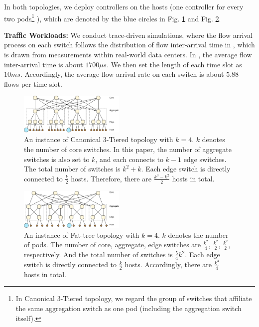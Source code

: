 \documentclass[10pt,journal,compsoc]{IEEEtran}
\begin{document}
In both topologies, we deploy controllers on the hosts (one controller for every two pods\footnote{In Canonical 3-Tiered topology, we regard the group of switches that affiliate the same aggregation switch as one pod (including the aggregation switch itself). } ), which are denoted by the blue circles in Fig. \ref{topo_3tiered} and Fig. \ref{topo_fattree}. 

\textbf{Traffic Workloads:} We conduct trace-driven simulations, where the flow arrival process on each switch follows the distribution of flow inter-arrival time in \cite{benson2010network}, which is drawn from measurements within real-world data centers. In \cite{benson2010network}, the average flow inter-arrival time is about $1700 \mu s$. We then set the length of each time slot as $10ms$. Accordingly, the average flow arrival rate on each switch is about $5.88$ flows per time slot. 

\begin{figure}[!t]
\centering
 \includegraphics[width=0.45\textwidth]{figures/3-tier.eps}
 \caption{An instance of Canonical 3-Tiered topology with $k=4$. $k$ denotes the number of core switches. In this paper, the number of aggregate switches is also set to $k$, and each connects to $k-1$ edge switches. The total number of switches is $k^2 + k$. Each edge switch is directly connected to $\frac{k}{2}$ hosts. Therefore, there are $\frac{k^3 - k^2}{2}$ hosts in total.} 
 \label{topo_3tiered}
\end{figure}

\begin{figure}[!t]
\centering
 \includegraphics[width=0.45\textwidth]{figures/fattree.eps}
 \caption{An instance of Fat-tree topology with $k=4$. $k$ denotes the number of pods. The number of core, aggregate, edge switches are $\frac{k^2}{4}$, $\frac{k^2}{2}$, $\frac{k^2}{2}$, respectively. And the total number of switches is $\frac54 k^2$. Each edge switch is directly connected to $\frac{k}{2}$ hosts. Accordingly, there are $\frac{k^3}{4}$ hosts in total.}
\label{topo_fattree}
\end{figure}
\end{document}
